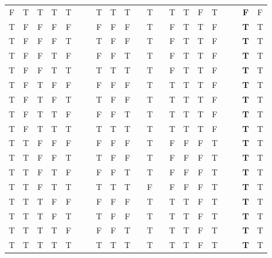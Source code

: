 \documentclass[a4paper,12pt]{article}
\begin{document}
\begin{enumerate}[label=\arabic*,leftmargin=*]
\begin{enumerate}[label=\arabic*.]
\begin{minipage}{\textwidth}
\begin{tabular}{c c c c c | c c c c c c c c c c c c c c c c}
                        F & T & T & T & T &   &   & T & T  & T &   & T   &   & T & T & F  & T &   &   & \textbf{F} & F\\
                        T & F & F & F & F &   &   & F & F  & F &   & T   &   & F & T & T  & F &   &   & \textbf{T} & T\\
                        T & F & F & F & T &   &   & T & F  & F &   & T   &   & F & T & T  & F &   &   & \textbf{T} & T\\
                        T & F & F & T & F &   &   & F & F  & T &   & T   &   & F & T & T  & F &   &   & \textbf{T} & T\\
                        T & F & F & T & T &   &   & T & T  & T &   & T   &   & F & T & T  & F &   &   & \textbf{T} & T\\
                        T & F & T & F & F &   &   & F & F  & F &   & T   &   & T & T & T  & F &   &   & \textbf{T} & T\\
                        T & F & T & F & T &   &   & T & F  & F &   & T   &   & T & T & T  & F &   &   & \textbf{T} & T\\
                        T & F & T & T & F &   &   & F & F  & T &   & T   &   & T & T & T  & F &   &   & \textbf{T} & T\\
                        T & F & T & T & T &   &   & T & T  & T &   & T   &   & T & T & T  & F &   &   & \textbf{T} & T\\
                        T & T & F & F & F &   &   & F & F  & F &   & T   &   & F & F & F  & T &   &   & \textbf{T} & T\\
                        T & T & F & F & T &   &   & T & F  & F &   & T   &   & F & F & F  & T &   &   & \textbf{T} & T\\
                        T & T & F & T & F &   &   & F & F  & T &   & T   &   & F & F & F  & T &   &   & \textbf{T} & T\\
                        T & T & F & T & T &   &   & T & T  & T &   & F   &   & F & F & F  & T &   &   & \textbf{T} & T\\
                        T & T & T & F & F &   &   & F & F  & F &   & T   &   & T & T & F  & T &   &   & \textbf{T} & T\\
                        T & T & T & F & T &   &   & T & F  & F &   & T   &   & T & T & F  & T &   &   & \textbf{T} & T\\
                        T & T & T & T & F &   &   & F & F  & T &   & T   &   & T & T & F  & T &   &   & \textbf{T} & T\\
                        T & T & T & T & T &   &   & T & T  & T &   & T   &   & T & T & F  & T &   &   & \textbf{T} & T\\
                    \end{tabular}
                    \vspace{1em}
                \end{minipage}

        \end{enumerate}
    \end{enumerate}
\end{document}
